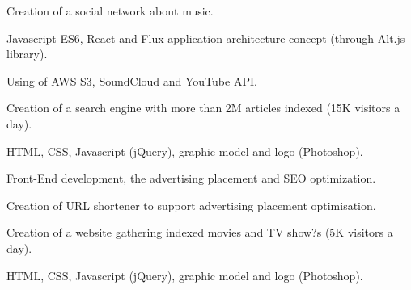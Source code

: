 \documentclass[letterpaper]{my-resume} %
\begin{document}
\begin{minipage}[t]{0.66\textwidth}
\sectionspace %



Creation of a social network about music.
\begin{tightitemize}
\item Javascript ES6, React and Flux application architecture concept (through Alt.js library).
\item Using of AWS S3, SoundCloud and YouTube API.
\end{tightitemize}

\sectionspace %



Creation of a search engine with more than 2M articles indexed (15K visitors a day).
\begin{tightitemize}
\item HTML, CSS, Javascript (jQuery), graphic model and logo (Photoshop).
\item Front-End development, the advertising placement and SEO optimization.
\item Creation of URL shortener to support advertising placement optimisation.
\end{tightitemize}

\sectionspace %



Creation of a website gathering indexed movies and TV show?s (5K visitors a day).
\begin{tightitemize}
\item HTML, CSS, Javascript (jQuery), graphic model and logo (Photoshop).
\end{tightitemize}

\sectionspace %


\end{minipage}
\end{document}
